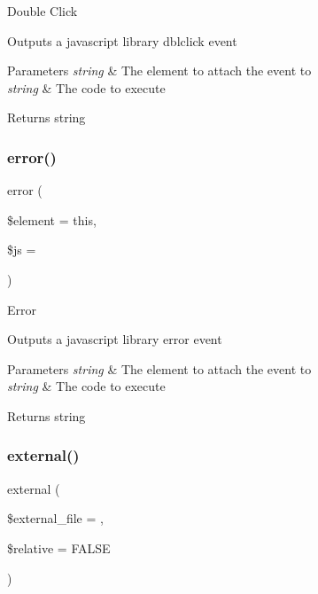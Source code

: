Double Click

Outputs a javascript library dblclick event


\begin{DoxyParams}{Parameters}
{\em string} & The element to attach the event to \\
\hline
{\em string} & The code to execute \\
\hline
\end{DoxyParams}
\begin{DoxyReturn}{Returns}
string 
\end{DoxyReturn}
\mbox{\label{class_c_i___javascript_ac6c4977af5ec27a5addbb3b2a28912e2}} 
\subsubsection{\texorpdfstring{error()}{error()}}
{\footnotesize\ttfamily error (\begin{DoxyParamCaption}\item[{}]{\$element = {\ttfamily \textquotesingle{}this\textquotesingle{}},  }\item[{}]{\$js = {\ttfamily \textquotesingle{}\textquotesingle{}} }\end{DoxyParamCaption})}

Error

Outputs a javascript library error event


\begin{DoxyParams}{Parameters}
{\em string} & The element to attach the event to \\
\hline
{\em string} & The code to execute \\
\hline
\end{DoxyParams}
\begin{DoxyReturn}{Returns}
string 
\end{DoxyReturn}
\mbox{\label{class_c_i___javascript_a1b1cfdf25c7ceae03d2c60019bdf59b9}} 
\subsubsection{\texorpdfstring{external()}{external()}}
{\footnotesize\ttfamily external (\begin{DoxyParamCaption}\item[{}]{\$external\+\_\+file = {\ttfamily \textquotesingle{}\textquotesingle{}},  }\item[{}]{\$relative = {\ttfamily FALSE} }\end{DoxyParamCaption})}

